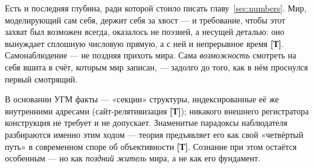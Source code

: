 \documentclass[11pt,letterpaper]{article}
\newcommand{\stT}{\textbf{[Т]}\xspace}
\begin{document}
Есть и последняя глубина, ради которой стоило писать
главу~\ref{sec:numbers}. Мир, моделирующий сам себя, держит себя за
хвост --- и требование, чтобы этот захват был возможен всегда,
оказалось не поэзией, а несущей деталью: оно вынуждает сплошную
числовую прямую, а с ней и непрерывное время \stT. Самонаблюдение ---
не поздняя прихоть мира. Сама \emph{возможность} смотреть на себя
вшита в счёт, которым мир записан, --- задолго до того, как в нём
проснулся первый смотрящий.

\begin{factbox}
В основании УГМ факты --- «секции» структуры, индексированные её же
внутренними адресами (сайт-релятивизация \stT); никакого внешнего
регистратора конструкция не требует и не допускает. Знаменитые
парадоксы наблюдателя разбираются именно этим ходом --- теория
предъявляет его как свой «четвёртый путь» в современном споре об
объективности \stT. Сознание при этом остаётся особенным --- но как
\emph{поздний житель} мира, а не как его фундамент.
\end{factbox}
\end{document}
